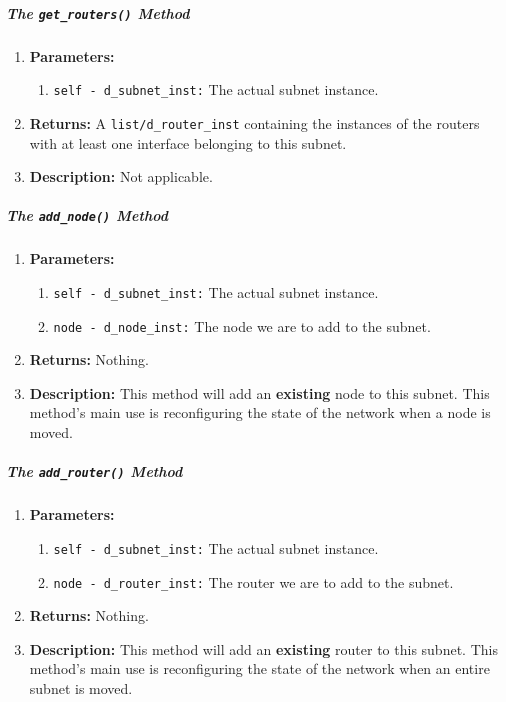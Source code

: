         \subparagraph{The \texttt{get\_routers()} Method}
            \begin{enumerate}
                \item \textbf{Parameters:}
                \begin{enumerate}
                    \item \texttt{self - d\_subnet\_inst:} The actual subnet instance.
                \end{enumerate}
                \item \textbf{Returns:} A \texttt{list/d\_router\_inst} containing the instances of the routers with at least one interface belonging to this subnet.
                \item \textbf{Description:} Not applicable.
            \end{enumerate}

        \subparagraph{The \texttt{add\_node()} Method}
            \begin{enumerate}
                \item \textbf{Parameters:}
                \begin{enumerate}
                    \item \texttt{self - d\_subnet\_inst:} The actual subnet instance.
                    \item \texttt{node - d\_node\_inst:} The node we are to add to the subnet.
                \end{enumerate}
                \item \textbf{Returns:} Nothing.
                \item \textbf{Description:} This method will add an \textbf{existing} node to this subnet. This method's main use is reconfiguring the state of the network when a node is moved.
            \end{enumerate}

        \subparagraph{The \texttt{add\_router()} Method}
            \begin{enumerate}
                \item \textbf{Parameters:}
                \begin{enumerate}
                    \item \texttt{self - d\_subnet\_inst:} The actual subnet instance.
                    \item \texttt{node - d\_router\_inst:} The router we are to add to the subnet.
                \end{enumerate}
                \item \textbf{Returns:} Nothing.
                \item \textbf{Description:} This method will add an \textbf{existing} router to this subnet. This method's main use is reconfiguring the state of the network when an entire subnet is moved.
            \end{enumerate}


